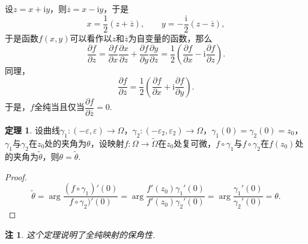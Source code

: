 \documentclass[12pt]{ctexart}
\theoremstyle{definition}
\newtheorem{theorem}{定理}
\theoremstyle{plain}
\newtheorem*{remark}{注}
\newcommand{\iu}{\mathrm{i}}
\begin{document}
	设$z=x+\iu y$，则$\overline{z}=x-\iu y$，于是
	\begin{equation}
		x=\frac{1}{2}(z+\overline{z}),\qquad y=-\frac{\iu}{2}(z-\overline{z}),
	\end{equation}
	于是函数$f(x,y)$可以看作以$z$和$\overline{z}$为自变量的函数，那么
	\begin{equation}
		\frac{\partial f}{\partial z}=\frac{\partial f}{\partial x}\frac{\partial x}{\partial z}+\frac{\partial f}{\partial y}\frac{\partial y}{\partial z}=\frac{1}{2}\left(\frac{\partial f}{\partial x}-\iu\frac{\partial f}{\partial z}\right).
	\end{equation}
	同理，
	\begin{equation}
		\frac{\partial f}{\partial\overline{z}}=\frac{1}{2}\left(\frac{\partial f}{\partial x}+\iu\frac{\partial f}{\partial y}\right).
	\end{equation}
	于是，$f$全纯当且仅当$\dfrac{\partial f}{\partial\overline{z}}=0$.
	\begin{theorem}
		设曲线$\gamma_1:(-\varepsilon,\varepsilon)\to\varOmega$，$\gamma_2:(-\varepsilon_2,\varepsilon_2)\to\varOmega$，$\gamma_1(0)=\gamma_2(0)=z_0$，$\gamma_1$与$\gamma_2$在$z_0$处的夹角为$\theta$，设映射$f:\varOmega\to\tilde{\varOmega}$在$z_0$处复可微，$f\circ\gamma_1$与$f\circ\gamma_2$在$f(z_0)$处的夹角为$\tilde{\theta}$，则$\theta=\tilde{\theta}$.
	\end{theorem}
	\begin{proof}
		\begin{equation}
			\tilde{\theta}=\arg\frac{(f\circ\gamma_1)'(0)}{f\circ\gamma_2)'(0)}=\arg\frac{f'(z_0)\gamma_1'(0)}{f'(z_0)\gamma_2'(0)}=\arg\frac{\gamma_1'(0)}{\gamma_2'(0)}=\theta.
		\end{equation}
	\end{proof}
	\begin{remark}
		这个定理说明了全纯映射的保角性.
	\end{remark}
\end{document}
